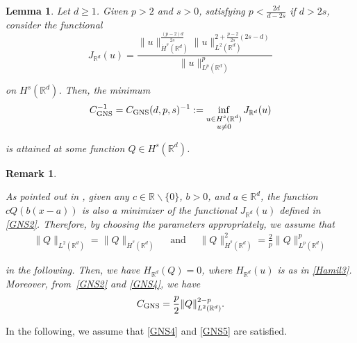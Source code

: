 \documentclass[letterpaper, 11pt,  reqno]{amsart}
\newtheorem{lemma}[theorem]{Lemma}
\newtheorem{remark}[theorem]{Remark}
\newcommand{\noi}{\noindent}
\newcommand{\R}{\mathbb{R}}
\numberwithin{equation}{section}
\numberwithin{theorem}{section}
\renewcommand{\u}{\vec{u}}
\newcommand{\GNS}{\textup{GNS}}
\begin{document}
 
 
 




\begin{lemma}
\label{LEM:GNS}
Let $d \geq 1$.
Given $p > 2$ and $s > 0$, satisfying
$ p < \frac{2 d}{d - 2 s}$ if $d >2 s$, 
consider the functional
\begin{equation}
\label{GNS2} 
J_{\R^d} (u) = 
\frac{\| u \|^{\frac{(p - 2) d}{2s}}_{\dot{H}^s (\mathbb{R}^d)} \| u \|_{L^2 (\mathbb{R}^d)}^{2 + \frac{p -2}{2 s} (2 s - d)}}{\| u \|^{p}_{L^p (\mathbb{R}^d)}}
\end{equation}
	
	
\noi
on $H^s (\mathbb{R}^d)$. 
Then, the minimum
\begin{equation}
\label{GNS3} 
C_{\GNS}^{- 1} =
C_{\GNS} (d, p, s)^{- 1} :=
\inf_{\substack{ u \in H^s (\mathbb{R}^d)\\u \neq 0}} J_{\R^d} (u)
\end{equation}
	
	
\noi
is attained at some function $Q \in H^s (\mathbb{R}^d)$.
\end{lemma}





\begin{remark}
\label{REM:GNS}
\rm

As pointed out 
in  \cite[Remark 2.2]{LW22},
given any $c \in \mathbb{R}\backslash \{ 0 \}$, $b > 0$, and $a \in \mathbb{R}^d$, 
the  function 
$ c Q (b (x - a))$
is also a minimizer of the functional $J_{\R^d}(u)$ defined in \eqref{GNS2}. 
Therefore, by choosing the parameters appropriately, we assume
that
\begin{align}
\label{GNS4} 
\| Q \|_{L^2 (\mathbb{R}^d)}  = \| Q \|_{\dot{H}^s (\mathbb{R}^d)}
\quad \text{ and }\quad\| Q \|_{\dot{H}^s (\mathbb{R}^d)}^2 = \frac{2}{p} \| Q \|_{L^p(\mathbb{R}^d)}^p 
\end{align}
	
	
\noi
in the following.
Then, 
we have  $H_{\mathbb{R}^d} (Q) = 0$, 
where 
$H_{\mathbb{R}^d} (u)$ is as in \eqref{Hamil3}.
Moreover,  from~\eqref{GNS2} and \eqref{GNS4}, we have
\begin{equation}
\label{GNS5} 
C_{\GNS} = \frac{p}{2} \| Q
\|^{2 - p}_{L^2 (\mathbb{R}^d)}.
\end{equation}
\end{remark}


\noi
In the following, we assume that \eqref{GNS4} and \eqref{GNS5} are satisfied.
\end{document}
